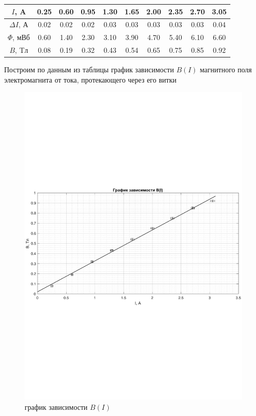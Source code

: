 \documentclass[a4paper,14pt]{article}
\begin{document}
\begin{center}
\begin{tabular}{|c|c|c|c|c|c|c|c|c|c|}
	\hline
	$I$, A & 0.25 & 0.60 & 0.95 & 1.30 & 1.65 & 2.00 & 2.35 & 2.70 & 3.05 \\
	\hline
	$\Delta I$, А & 0.02 & 0.02 & 0.02 & 0.03 & 0.03 & 0.03 & 0.03 & 0.03 & 0.04 \\
	\hline
	$\Phi$, мВб & 0.60 & 1.40 & 2.30 & 3.10 & 3.90 & 4.70 & 5.40 & 6.10 & 6.60 \\
	\hline
	$B$, Tл & 0.08 & 0.19 & 0.32 & 0.43 & 0.54 & 0.65 & 0.75 & 0.85 & 0.92 \\
	\hline
\end{tabular}
\end{center}

Построим по данным из таблицы график зависимости $B(I)$ магнитного поля электромагнита от тока, протекающего через его витки
\begin{center}
\begin{figure}[bhtp]
	\centering
	\includegraphics[width=\linewidth]{gr1.pdf}
	\caption{график зависимости $B(I)$}
\end{figure}
\end{center}
\end{document}
